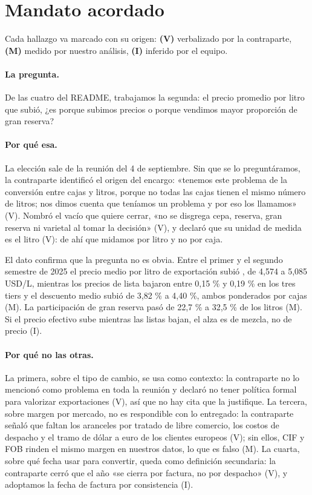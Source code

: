 
\section{Mandato acordado}

Cada hallazgo va marcado con su origen: \textbf{(V)} verbalizado por la contraparte, \textbf{(M)} medido por nuestro análisis, \textbf{(I)} inferido por el equipo.

\paragraph{La pregunta.} De las cuatro del README, trabajamos la segunda: el precio promedio por litro que subió, ¿es porque subimos precios o porque vendimos mayor proporción de gran reserva?

\paragraph{Por qué esa.} La elección sale de la reunión del 4 de septiembre. Sin que se lo preguntáramos, la contraparte identificó el origen del encargo: «tenemos este problema de la conversión entre cajas y litros, porque no todas las cajas tienen el mismo número de litros; nos dimos cuenta que teníamos un problema y por eso los llamamos» (V). Nombró el vacío que quiere cerrar, «no se disgrega cepa, reserva, gran reserva ni varietal al tomar la decisión» (V), y declaró que su unidad de medida es el litro (V): de ahí que midamos por litro y no por caja.

El dato confirma que la pregunta no es obvia. Entre el primer y el segundo semestre de 2025 el precio medio por litro de exportación subió , de 4,574 a 5,085 USD/L, mientras los precios de lista bajaron entre 0,15 \% y 0,19 \% en los tres tiers y el descuento medio subió de 3,82 \% a 4,40 \%, ambos ponderados por cajas (M). La participación de gran reserva pasó de 22,7 \% a 32,5 \% de los litros (M). Si el precio efectivo sube mientras las listas bajan, el alza es de mezcla, no de precio (I).

\paragraph{Por qué no las otras.} La primera, sobre el tipo de cambio, se usa como contexto: la contraparte no lo mencionó como problema en toda la reunión y declaró no tener política formal para valorizar exportaciones (V), así que no hay cita que la justifique. La tercera, sobre margen por mercado, no es respondible con lo entregado: la contraparte señaló que faltan los aranceles por tratado de libre comercio, los costos de despacho y el tramo de dólar a euro de los clientes europeos (V); sin ellos, CIF y FOB rinden el mismo margen en nuestros datos, lo que es falso (M). La cuarta, sobre qué fecha usar para convertir, queda como definición secundaria: la contraparte cerró que el año «se cierra por factura, no por despacho» (V), y adoptamos la fecha de factura por consistencia (I).

